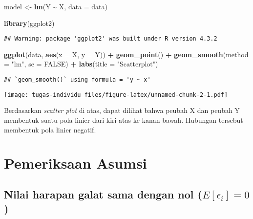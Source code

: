 \documentclass[
]{article}
\newenvironment{Shaded}{\begin{snugshade}}{\end{snugshade}}
\newcommand{\AttributeTok}[1]{\textcolor[rgb]{0.13,0.29,0.53}{#1}}
\newcommand{\ConstantTok}[1]{\textcolor[rgb]{0.56,0.35,0.01}{#1}}
\newcommand{\FunctionTok}[1]{\textcolor[rgb]{0.13,0.29,0.53}{\textbf{#1}}}
\newcommand{\NormalTok}[1]{#1}
\newcommand{\OtherTok}[1]{\textcolor[rgb]{0.56,0.35,0.01}{#1}}
\newcommand{\SpecialCharTok}[1]{\textcolor[rgb]{0.81,0.36,0.00}{\textbf{#1}}}
\newcommand{\StringTok}[1]{\textcolor[rgb]{0.31,0.60,0.02}{#1}}
\begin{document}
\begin{Shaded}
\begin{Highlighting}[]
\NormalTok{model }\OtherTok{\textless{}{-}} \FunctionTok{lm}\NormalTok{(Y }\SpecialCharTok{\textasciitilde{}}\NormalTok{ X, }\AttributeTok{data =}\NormalTok{ data)}

\FunctionTok{library}\NormalTok{(ggplot2)}
\end{Highlighting}
\end{Shaded}

\begin{verbatim}
## Warning: package 'ggplot2' was built under R version 4.3.2
\end{verbatim}

\begin{Shaded}
\begin{Highlighting}[]
\FunctionTok{ggplot}\NormalTok{(data, }\FunctionTok{aes}\NormalTok{(}\AttributeTok{x =}\NormalTok{ X, }\AttributeTok{y =}\NormalTok{ Y)) }\SpecialCharTok{+} 
  \FunctionTok{geom\_point}\NormalTok{() }\SpecialCharTok{+}
  \FunctionTok{geom\_smooth}\NormalTok{(}\AttributeTok{method =} \StringTok{"lm"}\NormalTok{, }\AttributeTok{se =} \ConstantTok{FALSE}\NormalTok{) }\SpecialCharTok{+}
  \FunctionTok{labs}\NormalTok{(}\AttributeTok{title =} \StringTok{"Scatterplot"}\NormalTok{)}
\end{Highlighting}
\end{Shaded}

\begin{verbatim}
## `geom_smooth()` using formula = 'y ~ x'
\end{verbatim}

\texttt{[image: tugas-individu\_files/figure-latex/unnamed-chunk-2-1.pdf]}

Berdasarkan \emph{scatter plot} di atas, dapat dilihat bahwa peubah X
dan peubah Y membentuk suatu pola linier dari kiri atas ke kanan bawah.
Hubungan tersebut membentuk pola linier negatif.

\hypertarget{pemeriksaan-asumsi}{%
\section{Pemeriksaan Asumsi}\label{pemeriksaan-asumsi}}

\hypertarget{nilai-harapan-galat-sama-dengan-nol-eepsilon_i0}{%
\subsection{\texorpdfstring{Nilai harapan galat sama dengan nol
(\(E[\epsilon_i]=0\))}{Nilai harapan galat sama dengan nol (E{[}\textbackslash epsilon\_i{]}=0)}}\label{nilai-harapan-galat-sama-dengan-nol-eepsilon_i0}}
\end{document}
